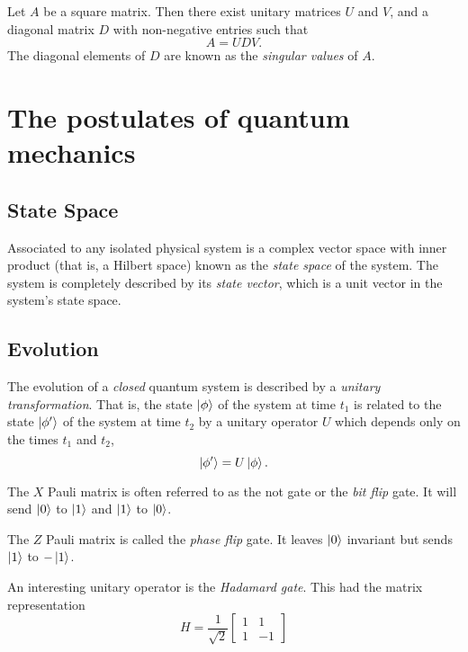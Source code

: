 \documentclass{article}
\begin{document}
\begin{theorem}
  Let $A$ be a square matrix. Then there exist unitary matrices
  $U$ and $V$, and a diagonal matrix $D$ with non-negative entries
  such that
  \[A=UDV.\]
  The diagonal elements of $D$ are known as the
  \textit{singular values} of $A$.
\end{theorem}

\section{The postulates of quantum mechanics}
\subsection{State Space}


\begin{postulate}
  Associated to any isolated physical system is a complex vector space with inner product (that is, a Hilbert space) known as the \textit{state space} of the system. The system is completely described by its \textit{state vector}, which is a unit vector in the system's state space.
\end{postulate}

\subsection{Evolution}

\begin{postulate}
  The evolution of a \textit{closed} quantum system is described by a \textit{unitary transformation}. That is, the state $\ket{\phi}$ of the system at time $t_1$ is related to the state $\ket{\phi'}$ of the system at time $t_2$ by a unitary operator $U$ which depends only on the times $t_1$ and $t_2$,
  \[\ket{\phi'}=U\ket{\phi}.\]
\end{postulate}

The $X$ Pauli matrix is often referred to as the not gate or the \textit{bit flip} gate. It will send $\ket0$ to $\ket1$ and $\ket1$ to $\ket0$.

The $Z$ Pauli matrix is called the \textit{phase flip} gate. It leaves $\ket0$ invariant but sends $\ket1$ to $-\ket1$.

\begin{definition}
  An interesting unitary operator is the \textit{Hadamard gate}. This had the matrix representation
  \[H=\frac{1}{\sqrt2}
  \begin{bmatrix}
    1&1 \\
    1&-1
  \end{bmatrix}\]
\end{definition}
\end{document}
